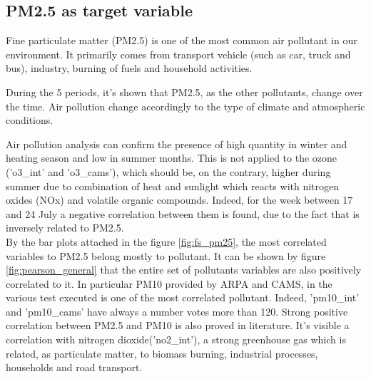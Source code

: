 \subsection{PM2.5 as target variable}
Fine particulate matter (PM2.5) is one of the most common air pollutant in our environment. 
It primarily comes from transport vehicle (such as car, truck and bus), industry, burning of fuels and household activities.\\ \par
During the 5 periods, it's shown that PM2.5, as the other pollutants, change over the time. Air pollution change accordingly to the type of climate and atmospheric conditions.\\

Air pollution analysis can confirm the presence of high quantity in winter and heating season and low in summer months\cite{cichowicz2017dispersion}. This is not applied to the ozone ('o3\_int' and 'o3\_cams'), which should be, on the contrary, higher during summer due to combination of heat and sunlight which reacts with nitrogen oxides (NOx) and volatile organic compounds. Indeed, for the week between 17 and 24 July a negative correlation between them is found, due to the fact that is inversely related to PM2.5.\\
By the bar plots attached in the figure \ref{fig:fs_pm25}, the most correlated variables to PM2.5 belong mostly to pollutant.
It can be shown by figure \ref{fig:pearson_general} that the entire set of pollutants variables are also positively correlated to it.
In particular PM10 provided by ARPA and CAMS, in the various test executed is one of the most correlated pollutant. Indeed, 'pm10\_int' and 'pm10\_cams' have always a number votes more than 120. Strong positive correlation between PM2.5 and PM10 is also proved in literature\cite{zhou2016concentrations}. 
It's visible a correlation with nitrogen dioxide('no2\_int'), a strong greenhouse gas which is related, as particulate matter, to biomass burning, industrial processes, households and road transport\cite{zellner2000john}\cite{maranzano2022air}.
